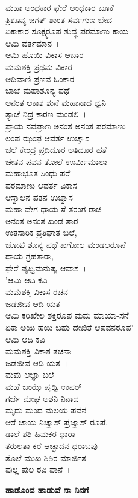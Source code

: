  ಮಹಾ ಅಂಧಕಾರ ಫೇರೆ ಅಂಧಕಾರ ಬೂಕೆ\\ತ್ರಿಶೂನ್ಯ ಜಗತ್ ಶಾಂತ ಸರ್ವಗುಣ ಭೇದ\\ಏಕಾಕಾರ ಸೂಕ್ಷ್ಮರೂಪ ಶುದ್ಧ ಪರಮಾಣು ಕಾಯ\\ಆಮಿ ವರ್ತಮಾನ~।\\ಆಮಿ ಹೊಯಿ ವಿಕಾಸ ಆಬಾರ\\ಮಮಶಕ್ತಿ ಪ್ರಥಮ ವಿಕಾರ\\ಆದಿವಾಣಿ ಪ್ರಣವ ಓಂಕಾರ\\ಬಾಜೆ ಮಹಾಶೂನ್ಯ ಪಥೆ\\ಅನಂತ ಆಕಾಶ ಶುನೆ ಮಹಾನಾದ ಧ್ವನಿ\\ತ್ಯಾಜೆ ನಿದ್ರ ಕಾರಣ ಮಂಡಲಿ~।\\ಪ್ರಾಯ ನವಪ್ರಾಣ ಅನಂತ ಅನಂತ ಪರಮಾಣು\\ಲಂಪ ಝಂಫ ಆವರ್ತ ಉಚ್ವಾಸ\\ಚಲೆ ಕೇಂದ್ರ ಪ್ರದಿದೂರ ಅತಿದೂರ ಹತೆ\\ಚೇತನ ಪವನ ತೋಲೆ ಊರ್ಮಿಮಾಲಾ\\ಮಹಾಭೂತ ಸಿಂಧು ಪರೆ\\ಪರಮಾಣು ಆವರ್ತ ವಿಕಾಸ\\ಆಸ್ವಾಲನ ಪತನ ಉಚ್ವಾಸ\\ಮಹಾ ವೇಗ ಧಾಯ ಸೆ ತರಂಗ ರಾಜಿ\\ಅನಂತ ಅನಂತ ಖಂಡ ತಾರ\\ಉತಸಾರಿಕ ಪ್ರತಿಘಾತ ಬಲೆ,\\ಚೋಟಿ ಶೂನ್ಯ ಪಥೆ ಖಗೋಲ ಮಂಡಲರೂಪೆ\\ಥಾಯ ಗ್ರಹತಾರಾ,\\ಫೇರೆ ಪೃಥ್ವಿಮನುಷ್ಯ ಆವಾಸ~।\\'ಆಮಿ ಆದಿ ಕವಿ\\ಮಮಶಕ್ತಿ ವಿಕಾಸ ರಚನ\\ಜಡಜೀವ ಆದಿ ಯತ\\ಆಮಿ ಕರಿಖೇಲ ಶಕ್ತಿರೂಪ ಮಮ ಮಾಯಾ-ಸನೆ\\ಏಕಾ ಅಯಿ ಹಯಿ ಬಹು ದೇಖಿತೆ ಆಪವನರೂಪ'\\ಆಮಿ ಆದಿ ಕವಿ\\ಮಮಶಕ್ತಿ ವಿಕಾಶ ತಚನಾ\\ಜಡಜೀವ ಆದಿ ಯತ~।\\ಮಮ ಆಜ್ಞಾ ಬಲೆ\\ಮಹೆ ಜಂಝೆ ಪೃಥ್ವಿ ಉಪರ್\\ಗರ್ಜೆ ಮೇಘ ಅಶನಿ ನಿನಾದ\\ಮೃದು ಮಂದ ಮಲಯ ಪವನ\\ಆಸೆ ಜಾಯ ನಿಚ್ವಾಸ್ ಪ್ರಜ್ವಾಸ್ ರೂಪೆ.\\ಢಾಲೆ ಶಶಿ ಹಿಮಕರ ಧಾರಾ\\ತರುಲತಾ ಕರೆ ಆಚ್ಛಾದನ ಧರಾಬಪು\\ತೊಲೆ ಮುಖ ಶಿಶಿರ ಮಾರ್ಜಿತ\\ಪುಲ್ಲ ಪುಲ ರವಿ ಪಾನೆ~।

\begin{center}
\textbf{ಹಾಡೊಂದ ಹಾಡುವೆ ನಾ ನಿನಗೆ}
\end{center}

